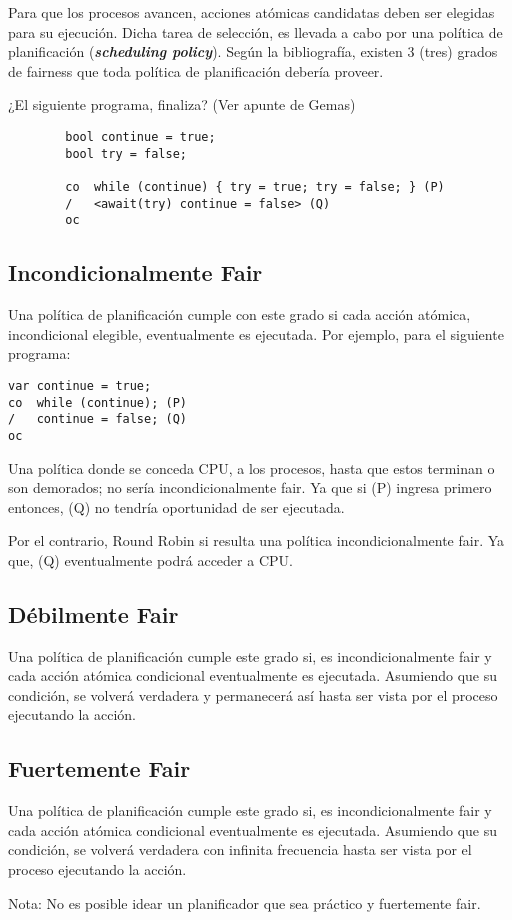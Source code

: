 \documentclass[a4paper, 10pt]{report}
\begin{document}
Para que los procesos avancen, acciones atómicas candidatas deben ser elegidas para su ejecución. Dicha tarea de selección, es llevada a cabo por una política de planificación (\textbf{\emph{scheduling policy}}). Según la bibliografía, existen 3 (tres) grados de fairness que toda política de planificación debería proveer.

\begin{basic_box}
     ¿El siguiente programa, finaliza? (Ver apunte de Gemas)

    \begin{lstlisting}
        bool continue = true;
        bool try = false;
        
        co  while (continue) { try = true; try = false; } (P)
        /   <await(try) continue = false> (Q)
        oc
    \end{lstlisting}

\end{basic_box}

\subsection{Incondicionalmente Fair}

Una política de planificación cumple con este grado si cada acción atómica, incondicional elegible, eventualmente es ejecutada. Por ejemplo, para el siguiente programa:

\begin{lstlisting}
var continue = true;
co  while (continue); (P)
/   continue = false; (Q)
oc
\end{lstlisting}


Una política donde se conceda CPU, a los procesos, hasta que estos terminan o son demorados; no sería incondicionalmente fair. Ya que si (P) ingresa primero entonces, (Q) no tendría oportunidad de ser ejecutada.

Por el contrario, Round Robin si resulta una política incondicionalmente fair. Ya que, (Q) eventualmente podrá acceder a CPU.

\subsection{Débilmente Fair}

Una política de planificación cumple este grado si, es incondicionalmente fair y cada acción atómica condicional eventualmente es ejecutada. Asumiendo que su condición, se volverá verdadera y permanecerá así hasta ser vista por el proceso ejecutando la acción.

\subsection{Fuertemente Fair}

Una política de planificación cumple este grado si, es incondicionalmente fair y cada acción atómica condicional eventualmente es ejecutada. Asumiendo que su condición, se volverá verdadera con infinita frecuencia hasta ser vista por el proceso ejecutando la acción.

Nota: No es posible idear un planificador que sea práctico y fuertemente fair.
\end{document}
